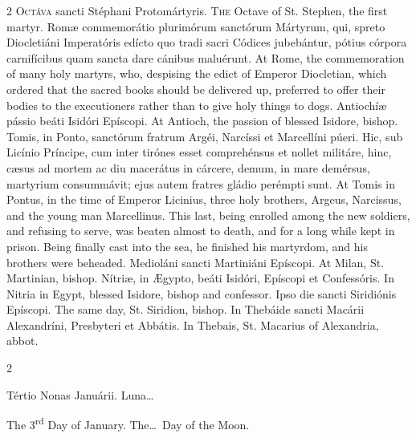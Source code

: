 \begin{paracol}{2}
\lettrine[lines=1]{O}{ctáva} sancti Stéphani Protomártyris.
\switchcolumn
{}
\lettrine[lines=1]{T}{he} Octave of St. Stephen, the first martyr.
\switchcolumn*
{}
Romæ commemorátio plurimórum sanctórum Mártyrum, 
 qui, spreto Diocletiáni Imperatóris edícto quo tradi sacri Códices 
 jubebántur, pótius córpora carnifícibus quam sancta dare cánibus maluérunt.
\switchcolumn
{}
At Rome, the commemoration of many holy martyrs, who, despising the edict of 
 Emperor Diocletian, which ordered that the sacred books should be delivered 
 up, preferred to offer their bodies to the executioners rather than to give 
 holy things to dogs.
\switchcolumn*
{}
Antiochíæ pássio beáti Isidóri Epíscopi.
\switchcolumn
{}
At Antioch, the passion of blessed Isidore, bishop.
\switchcolumn*
{}
Tomis, in Ponto, sanctórum fratrum Argéi, 
 Narcíssi et Marcellíni púeri. Hic, sub Licínio Príncipe, cum inter 
 tirónes esset comprehénsus et nollet militáre, hinc, cæsus ad mortem ac diu 
 macerátus in cárcere, demum, in mare demérsus, martyrium consummávit; ejus 
 autem fratres gládio perémpti sunt.
\switchcolumn
{}
At Tomis in Pontus, in the time of Emperor Licinius, three holy brothers, 
 Argeus, Narcissus, and the young man Marcellinus. This last, being 
 enrolled among the new soldiers, and refusing to serve, was beaten almost to 
 death, and for a long while kept in prison. Being finally cast into 
 the sea, he finished his martyrdom, and his brothers were beheaded.
\switchcolumn*
{}
Medioláni sancti Martiniáni Epíscopi.
\switchcolumn
{}
At Milan, St. Martinian, bishop.
\switchcolumn*
{}
Nítriæ, in Ægypto, beáti Isidóri, Epíscopi et 
 Confessóris.
\switchcolumn
{}
In Nitria in Egypt, blessed Isidore, bishop and confessor.
\switchcolumn*
{}
Ipso die sancti Siridiónis Epíscopi.
\switchcolumn
{}
The same day, St. Siridion, bishop.
\switchcolumn*
{}
In Thebáide sancti Macárii Alexandríni, Presbyteri et Abbátis.
\switchcolumn
{}
In Thebais, St. Macarius of Alexandria, abbot.
\switchcolumn*
{}
\end{paracol}


\begin{paracol}{2}
\begin{center}{\color{gregoriocolor} Tértio Nonas Januárii. 
 Luna\dots\ }\end{center}
\switchcolumn
{}
\begin{center}{\color{gregoriocolor} The   3\textsuperscript{rd} Day of 
 January. The\dots\ Day of the Moon.}\end{center}
\end{paracol}

